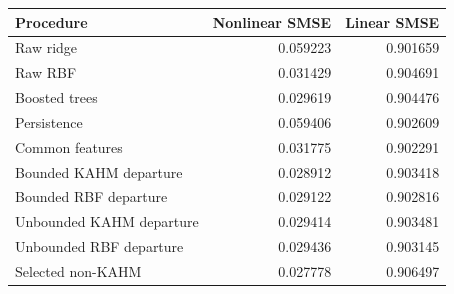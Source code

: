 \begin{tabular}{@{}lrr@{}}
\toprule
Procedure & Nonlinear SMSE & Linear SMSE \\
\midrule
Raw ridge & 0.059223 & 0.901659 \\
Raw RBF & 0.031429 & 0.904691 \\
Boosted trees & 0.029619 & 0.904476 \\
Persistence & 0.059406 & 0.902609 \\
Common features & 0.031775 & 0.902291 \\
Bounded KAHM departure & 0.028912 & 0.903418 \\
Bounded RBF departure & 0.029122 & 0.902816 \\
Unbounded KAHM departure & 0.029414 & 0.903481 \\
Unbounded RBF departure & 0.029436 & 0.903145 \\
Selected non-KAHM & 0.027778 & 0.906497 \\
\bottomrule
\end{tabular}
